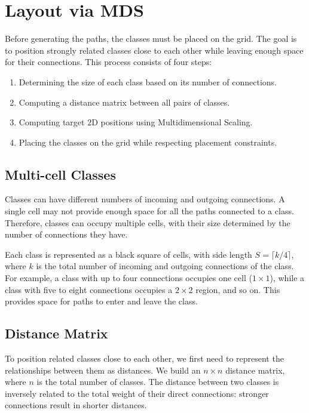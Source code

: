 \documentclass[../../main.tex]{subfiles}
\begin{document}
\section{Layout via MDS}
\label{sec:layout_via_MDS}

Before generating the paths, the classes must be placed on the grid. The goal is to position strongly related classes close to each other while leaving enough space for their connections. This process consists of four steps:

\begin{enumerate}
    \item Determining the size of each class based on its number of connections.
    \item Computing a distance matrix between all pairs of classes.
    \item Computing target 2D positions using Multidimensional Scaling.
    \item Placing the classes on the grid while respecting placement constraints.
\end{enumerate}

\subsection{Multi-cell Classes}

Classes can have different numbers of incoming and outgoing connections. A single cell may not provide enough space for all the paths connected to a class. Therefore, classes can occupy multiple cells, with their size determined by the number of connections they have.

Each class is represented as a black square of cells, with side length $S = \lceil k/4 \rceil$, where $k$ is the total number of incoming and outgoing connections of the class. For example, a class with up to four connections occupies one cell ($1 \times 1$), while a class with five to eight connections occupies a $2 \times 2$ region, and so on. This provides space for paths to enter and leave the class.

\subsection{Distance Matrix}

To position related classes close to each other, we first need to represent the relationships between them as distances. We build an $n \times n$ distance matrix, where $n$ is the total number of classes. The distance between two classes is inversely related to the total weight of their direct connections: stronger connections result in shorter distances.
\end{document}
